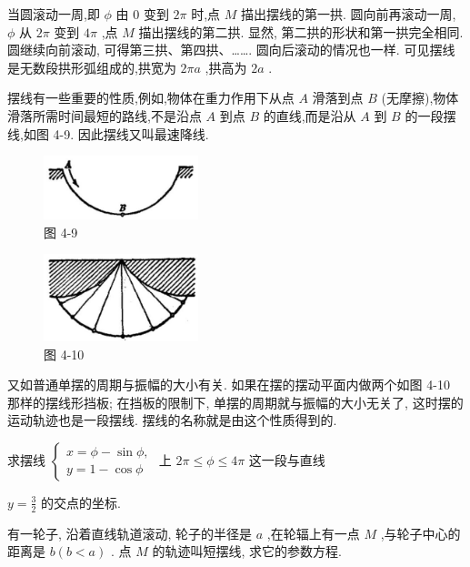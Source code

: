 \documentclass[lang=cn,newtx,12pt,scheme=chinese]{elegantbook}
\begin{document}
当圆滚动一周,即 \(\phi\) 由 0 变到 \({2\pi }\) 时,点 \(M\) 描出摆线的第一拱. 圆向前再滚动一周, \(\phi\) 从 \({2\pi }\) 变到 \({4\pi }\) ,点 \(M\) 描出摆线的第二拱. 显然, 第二拱的形状和第一拱完全相同. 圆继续向前滚动, 可得第三拱、第四拱、……. 圆向后滚动的情况也一样. 可见摆线是无数段拱形弧组成的,拱宽为 \({2\pi a}\) ,拱高为 \({2a}\) .

摆线有一些重要的性质,例如,物体在重力作用下从点 \(A\) 滑落到点 \(B\) (无摩擦),物体滑落所需时间最短的路线,不是沿点 \(A\) 到点 \(B\) 的直线,而是沿从 \(A\) 到 \(B\) 的一段摆线,如图 4-9. 因此摆线又叫最速降线.

\begin{figure}[h]
  \centering
  \includegraphics[max width=0.4\textwidth]{images/01912cc2-ffb6-728e-9ae7-b113ff05c64b_170_643449.jpg}
  \caption{图 4-9}
\end{figure}

\begin{figure}[h]
  \centering
  \includegraphics[max width=0.4\textwidth]{images/01912cc2-ffb6-728e-9ae7-b113ff05c64b_170_567819.jpg}
  \caption{图 4-10}
\end{figure}

又如普通单摆的周期与振幅的大小有关. 如果在摆的摆动平面内做两个如图 4-10 那样的摆线形挡板; 在挡板的限制下, 单摆的周期就与振幅的大小无关了, 这时摆的运动轨迹也是一段摆线. 摆线的名称就是由这个性质得到的.

\begin{problemset}[练习]

\item 求摆线 \(\left\{ \begin{array}{l} x = \phi - \sin \phi , \\ y = 1 - \cos \phi \end{array}\right.\) 上 \({2\pi } \leq \phi \leq {4\pi }\) 这一段与直线

\(y = \frac{3}{2}\) 的交点的坐标.

\item 有一轮子, 沿着直线轨道滚动, 轮子的半径是 \(a\) ,在轮辐上有一点 \(M\) ,与轮子中心的距离是 \(b\left( {b < a}\right)\) . 点 \(M\) 的轨迹叫短摆线, 求它的参数方程.

\end{problemset}
\end{document}
